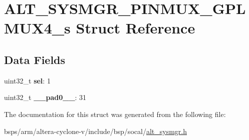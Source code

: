 \hypertarget{structALT__SYSMGR__PINMUX__GPLMUX4__s}{}\section{A\+L\+T\+\_\+\+S\+Y\+S\+M\+G\+R\+\_\+\+P\+I\+N\+M\+U\+X\+\_\+\+G\+P\+L\+M\+U\+X4\+\_\+s Struct Reference}
\label{structALT__SYSMGR__PINMUX__GPLMUX4__s}
\subsection*{Data Fields}
\begin{DoxyCompactItemize}
\item 
\mbox{\label{structALT__SYSMGR__PINMUX__GPLMUX4__s_a296016fd950fbab371f2f6ed30ea8e50}} 
uint32\+\_\+t {\bfseries sel}\+: 1
\item 
\mbox{\label{structALT__SYSMGR__PINMUX__GPLMUX4__s_afe2796bbde8d07830d177be2d0e942e9}} 
uint32\+\_\+t {\bfseries \+\_\+\+\_\+pad0\+\_\+\+\_\+}\+: 31
\end{DoxyCompactItemize}


The documentation for this struct was generated from the following file\+:\begin{DoxyCompactItemize}
\item 
bsps/arm/altera-\/cyclone-\/v/include/bsp/socal/\mbox{\hyperlink{alt__sysmgr_8h}{alt\+\_\+sysmgr.\+h}}\end{DoxyCompactItemize}
